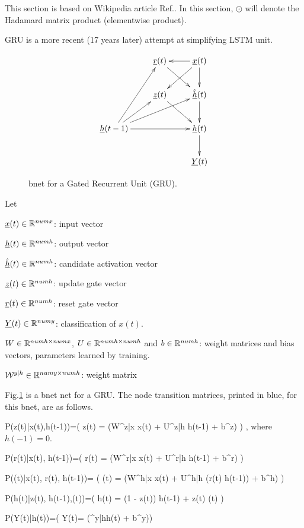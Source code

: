 This 
section is based 
on Wikipedia article Ref.\cite{gru}. In this section,
$\odot$
will denote the Hadamard matrix product
(elementwise product).

GRU is a more recent (17 years later)
attempt at simplifying LSTM unit.

\begin{figure}[h!]
\centering
$$\xymatrix{
&\rvr(t)\ar[dr]&\rvx(t)\ar[d]\ar[dl]\ar[l]
\\
&\rvz(t)\ar[dr]
&\hat{\rvh}(t)\ar[d]
\\
\rvh(t-1)\ar[ur]\ar[rr]\ar[urr]\ar[uur]
&&\rvh(t)\ar[d]
\\
&&\rvY(t)
}$$
\caption{bnet for a Gated
Recurrent Unit (GRU).}
\label{fig-rnn-gru}
\end{figure}

Let

${\underline{x}}(t)\in { \mathbb{R}}^{numx}$: input vector

${\underline{h}}(t)\in{ \mathbb{R}}^{numh}$: output vector

$\hat{{\underline{h}}}(t)\in{ \mathbb{R}}^{numh}$: candidate activation vector

${\underline{z}}(t)\in{ \mathbb{R}}^{numh}$: update gate vector

${\underline{r}}(t)\in{ \mathbb{R}}^{numh}$: reset gate vector

${\underline{Y}}(t)\in { \mathbb{R}}^{numy}$: 
classification of $x(t)$.

$W\in { \mathbb{R}}^{numh\times numx}$, 
$U\in { \mathbb{R}}^{numh\times numh}$
and 
$b\in { \mathbb{R}}^{numh}$: 
weight matrices and bias vectors,
 parameters learned by training.

${\cal W}^{y|h}\in { \mathbb{R}}^{numy\times numh}$:
 weight matrix

Fig.\ref{fig-rnn-gru}
is a bnet net
for a GRU.
The node transition matrices, printed in blue,
for this bnet, are
as follows.


\beq\color{blue}
P(z(t)|x(t),h(t-1))=\indi(\;\;\;
z(t) = \sig(W^{z|x} x(t) + U^{z|h} h(t-1) + b^z)
\;\;\;)
\;,
\eeq
where $h(-1)=0$.

\beq\color{blue}
P(r(t)|x(t), h(t-1))=\indi(\;\;\;
r(t) = \sig(W^{r|x} x(t) + U^{r|h} h(t-1) + b^r)
\;\;\;)
\eeq

\beq\color{blue}
P((t)|x(t), r(t), h(t-1))=
\indi(\;\;\;
(t) = \tanh(W^{h|x} x(t) +
 U^{h|h} (r(t) \odot h(t-1)) + b^h)
\;\;\;)
\eeq

\beq\color{blue}
P(h(t)|z(t), h(t-1),(t))=\indi(\;\;\;
h(t) =  (1 - z(t)) \odot h(t-1) +
 z(t) \odot {}(t)
\;\;\;)
\eeq

\beq\color{blue}
P(Y(t)|h(t))=\indi(\;\;\;
Y(t)= \cala(\calw^{y|h}h(t) + b^y)\;\;\;)
\eeq